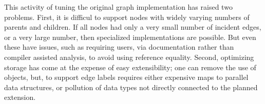 
This activity of tuning the original graph implementation has raised two
problems. First, it is difficul to support nodes with widely varying numbers of
parents and children. If all nodes had only a very small number of incident
edges, or a very large number, then specialized implementations are possible.
But even these have issues, such as requiring users, via documentation rather
than compiler assisted analysis, to avoid using reference equality.
Second, optimizing storage has come at the expense of easy extensibility; one
can remove the use of  objects, but, to support edge labels requires
either expensive maps to parallel data structures, or pollution of data types
not directly connected to the planned extension.


